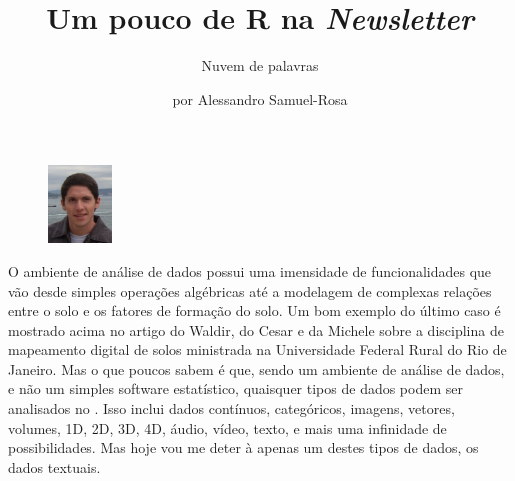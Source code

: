 \title{Um pouco de R na \textit{Newsletter}}
\subtitle{Nuvem de palavras}
\author{por Alessandro Samuel-Rosa}
\maketitle
\begin{figure}
\includegraphics[width=0.15\textwidth]{figuras/foto-alessandro}
\end{figure}
O ambiente de análise de dados \R{} possui uma imensidade de funcionalidades que vão desde simples operações algébricas até a modelagem de complexas relações entre o solo e os fatores de formação do solo. Um bom exemplo do último caso é mostrado acima no artigo do Waldir, do Cesar e da Michele sobre a disciplina de mapeamento digital de solos ministrada na Universidade Federal Rural do Rio de Janeiro. Mas o que poucos sabem é que, sendo um ambiente de análise de dados, e não um simples software estatístico, quaisquer tipos de dados podem ser analisados no \R{}. Isso inclui dados contínuos, categóricos, imagens, vetores, volumes, 1D, 2D, 3D, 4D, áudio, vídeo, texto, e mais uma infinidade de possibilidades. Mas hoje vou me deter à apenas um destes tipos de dados, os dados textuais.
